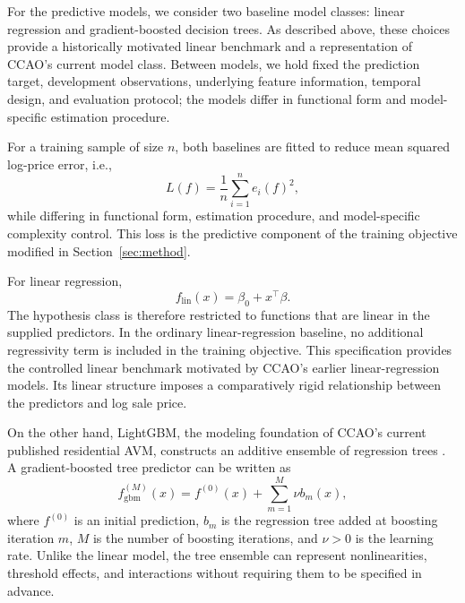 \documentclass[10pt]{article}
\theoremstyle{definition}
\newcommand{\1}{\mathbf{1}}
\begin{document}
For the predictive models, we consider two baseline model classes: linear regression and gradient-boosted decision trees. As described above, these choices provide a historically motivated linear benchmark and a representation of CCAO's current model class. Between models, we hold fixed the prediction target, development observations, underlying feature information, temporal design, and evaluation protocol; the models differ in functional form and model-specific estimation procedure.

For a training sample of size $n$, both baselines are fitted to reduce mean squared log-price error, i.e.,
\begin{equation}
\label{eq:baseline_learning}
L(f)
=
\frac{1}{n}\sum_{i=1}^n e_i(f)^2,
\end{equation}
while differing in functional form, estimation procedure, and model-specific complexity control. This loss is the predictive component of the training objective modified in Section~\ref{sec:method}.

For linear regression,
\begin{equation}
\label{eq:linear_model}
f_{\mathrm{lin}}(x)
=
\beta_0+x^\top\beta.
\end{equation}
The hypothesis class is therefore restricted to functions that are linear in the supplied predictors. In the ordinary linear-regression baseline, no additional regressivity term is included in the training objective. This specification provides the controlled linear benchmark motivated by CCAO's earlier linear-regression models. Its linear structure imposes a comparatively rigid relationship between the predictors and log sale price.


{On the other hand, LightGBM, the modeling foundation of CCAO's current published residential AVM, constructs an additive ensemble of regression trees \cite{CCAOModelResAVM2026,lightgbm}. A gradient-boosted tree predictor can be written as}
\begin{equation}
\label{eq:boosted_tree_model}
f_{\mathrm{gbm}}^{(M)}(x)
=
f^{(0)}(x)
+
\sum_{m=1}^{M}\nu b_m(x),
\end{equation}
where $f^{(0)}$ is an initial prediction, $b_m$ is the regression tree added at boosting iteration $m$, $M$ is the number of boosting iterations, and $\nu>0$ is the learning rate. Unlike the linear model, the tree ensemble can represent nonlinearities, threshold effects, and interactions without requiring them to be specified in advance.
\end{document}

